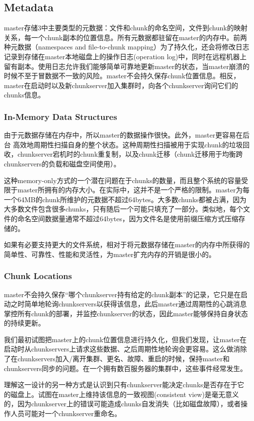 \documentclass{article}
\begin{document}
\subsection{Metadata}
master存储3中主要类型的元数据：文件和chunk的命名空间，文件到chunk的映射关系，每一个chunk副本的位置信息。所有元数据都驻留在master的内存中。前两种元数据（namespaces and file-to-chunk mapping）为了持久化，还会将修改日志记录到存储在master本地磁盘上的操作日志(operation log)中，同时在远程机器上留有副本。使用日志允许我们能够简单可靠地更新master的状态，当master崩溃的时候不至于冒数据不一致的风险。master不会持久保存chunk位置信息。相反，master在启动时以及新chunkserver加入集群时，向各个chunkserver询问它们的chunks信息。

\subsubsection{In-Memory Data Structures}
由于元数据存储在内存中，所以master的数据操作很快。此外，master更容易在后台 高效地周期性扫描自身的整个状态。这种周期性扫描被用于实现chunk的垃圾回收，chunkserver宕机时的chunk重复制，以及chunk迁移（chunk迁移用于均衡跨chunkservers的负载和磁盘空间使用）。\par
这种memory-only方式的一个潜在问题在于chunks的数量，而且整个系统的容量受限于master所拥有的内存大小。在实际中，这并不是一个严格的限制。master为每一个64MB的chunk所维护的元数据不超过64bytes。大多数chunks都被占满，因为大多数文件包含很多chunks，只有随后一个可能只填充了一部分。类似地，每个文件的命名空间数据量通常不超过64bytes，因为文件名是使用前缀压缩方式压缩存储的。\par
如果有必要支持更大的文件系统，相对于将元数据存储在master的内存中所获得的简单性、可靠性、性能和灵活性，为master扩充内存的开销是很小的。

\subsubsection{Chunk Locations}
master不会持久保存“哪个chunkserver持有给定的chunk副本”的记录，它只是在启动之时简单地轮询chunkservers以获得该信息，此后master通过周期性的心跳消息掌控所有chunk的部署，并监控chunkserver的状态，因此master能够保持自身状态的持续更新。\par
我们最初试图把master上的chunk位置信息进行持久化，但我们发现，让master在启动时从chunkservers上请求这些数据、之后周期性地轮询会更容易。这么做消除了在chunkservers加入/离开集群、更名、故障、重启的时候，保持master和chunkservers同步的问题。在一个拥有数百服务器的集群中，这些事件经常发生。\par
理解这一设计的另一种方式是认识到只有chunkserver能决定chunks是否存在于它的磁盘上。试图在master上维持该信息的一致视图(consistent view)是毫无意义的，因为chunkserver上的错误可能造成chunks自发消失（比如磁盘故障），或者操作人员可能对一个chunkserver重命名。
\end{document}
